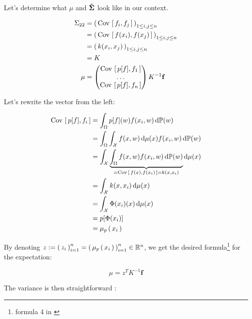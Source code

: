 Let's determine what $\mu$ and $\mathbf{\tilde{\Sigma}}$ look like in our context.
  \begin{boxitemize}
\begin{align*}
  \Sigma _ { 22 } &= \left( \, \mathrm{Cov} \, \left[ \, f_i, f_j \, \right] \, \right)_{1 \leq i,j \leq n}\\
  &= \left( \, \mathrm{Cov} \, \left[ \, f(x_i), f(x_j) \, \right] \, \right)_{1 \leq i,j \leq n}\\
  &= \left( \, k(x_i, x_j) \, \right)_{1 \leq i,j \leq n}\\
  &= K\\
  \mu &= \begin{pmatrix}
    \mathrm{Cov} \, \left[ \, p[f], f_1 \, \right] \\ \ldots \\ \mathrm{Cov} \, \left[ \, p[f], f_n \, \right]\\
\end{pmatrix} K^{-1} \mathbf{f}
\end{align*}
\end{boxitemize}
Let's rewrite the vector from the left:
\begin{boxitemize}
\begin{align*}
\mathrm{Cov} \, \left[ \, p[f], f_i \, \right] &= \int_{\Omega} p[f](w) f(x_i, w) \mathop{}\mathopen{}\mathrm{d} \mathbb{P}(w)\\
&= \int_{\Omega} \int_{\mathcal{X}} f(x, w) \mathop{}\mathopen{}\mathrm{d} \mu(x) f(x_i, w) \mathop{}\mathopen{}\mathrm{d} \mathbb{P}(w)\\
&=  \int_{\mathcal{X}}  \underbrace{\int_{\Omega} f(x, w) f(x_i, w) \mathop{}\mathopen{}\mathrm{d} \mathbb{P}(w)}_{=\mathrm{Cov} \, \left[ \, f(x), f(x_i) \, \right]=k(x,x_i)} \mathop{}\mathopen{}\mathrm{d} \mu(x) \\
&= \int_{\mathcal{X}} k(x,x_i)\mathop{}\mathopen{}\mathrm{d} \mu(x)\\
&= \int_{\mathcal{X}} \Phi(x_i)(x) \mathop{}\mathopen{}\mathrm{d} \mu(x)\\
&= p[\Phi(x_i)]\\
&= \mu_p \left( \, x_i \, \right)\\
\end{align*}
\end{boxitemize}

By denoting $z := \left( \, z_i \, \right)_{i=1}^n = \left( \, \mu_p \left( \, x_i \, \right) \, \right)_{i=1}^n \in \mathbb{R}^n$, we
 get the desired formula\footnote{formula 4 in \cite{FWBQ} } for the expectation:
 \begin{boxtheorem}
   \begin{equation}
     \mu = z ^ { T } K ^ { - 1 } \mathbf { f }
   \end{equation}
 \end{boxtheorem}

The variance is then straightforward :

